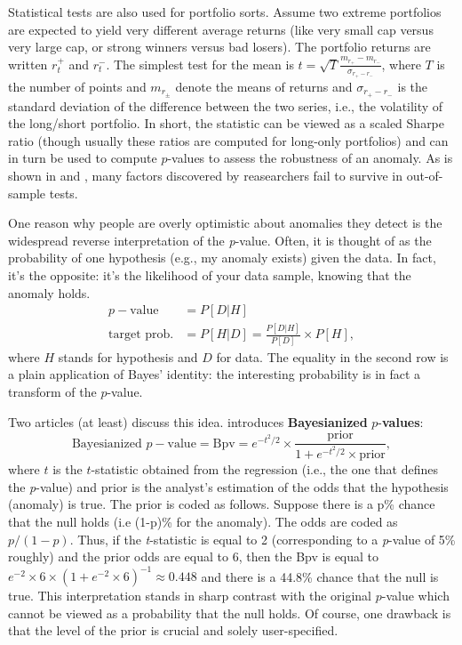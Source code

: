 \documentclass[]{krantz}
\theoremstyle{definition}
\theoremstyle{definition}
\theoremstyle{definition}
\theoremstyle{remark}
\begin{document}
Statistical tests are also used for portfolio sorts. Assume two extreme
portfolios are expected to yield very different average returns (like
very small cap versus very large cap, or strong winners versus bad
losers). The portfolio returns are written \(r_t^+\) and \(r_t^-\). The
simplest test for the mean is
\(t=\sqrt{T}\frac{m_{r_+}-m_{r_-}}{\sigma_{r_+-r_-}}\), where \(T\) is
the number of points and \(m_{r_\pm}\) denote the means of returns and
\(\sigma_{r_+-r_-}\) is the standard deviation of the difference between
the two series, i.e., the volatility of the long/short portfolio. In
short, the statistic can be viewed as a scaled Sharpe ratio (though
usually these ratios are computed for long-only portfolios) and can in
turn be used to compute \(p\)-values to assess the robustness of an
anomaly. As is shown in \citet{linnainmaa2018history} and
\citet{hou2019replicating}, many factors discovered by reasearchers fail
to survive in out-of-sample tests.

One reason why people are overly optimistic about anomalies they detect
is the widespread reverse interpretation of the \emph{p}-value. Often,
it is thought of as the probability of one hypothesis (e.g., my anomaly
exists) given the data. In fact, it's the opposite: it's the likelihood
of your data sample, knowing that the anomaly holds. \begin{align*}
p-\text{value} &= P[D|H] \\
\text{target prob.}& = P[H|D]=\frac{P[D|H]}{P[D]}\times P[H],
\end{align*} where \(H\) stands for hypothesis and \(D\) for data. The
equality in the second row is a plain application of Bayes' identity:
the interesting probability is in fact a transform of the \(p\)-value.

Two articles (at least) discuss this idea.
\citet{harvey2017presidential} introduces \textbf{Bayesianized}
\(p\)-\textbf{values}: \begin{equation}
\label{eq:Bpv}
\text{Bayesianized } p-\text{value}=\text{Bpv}= e^{-t^2/2}\times\frac{\text{prior}}{1+e^{-t^2/2}\times \text{prior}} ,
\end{equation} where \(t\) is the \(t\)-statistic obtained from the
regression (i.e., the one that defines the \emph{p}-value) and prior is
the analyst's estimation of the odds that the hypothesis (anomaly) is
true. The prior is coded as follows. Suppose there is a p\% chance that
the null holds (i.e (1-p)\% for the anomaly). The odds are coded as
\(p/(1-p)\). Thus, if the \emph{t}-statistic is equal to 2
(corresponding to a \emph{p}-value of 5\% roughly) and the prior odds
are equal to 6, then the Bpv is equal to
\(e^{-2}\times 6 \times(1+e^{-2}\times 6)^{-1}\approx 0.448\) and there
is a 44.8\% chance that the null is true. This interpretation stands in
sharp contrast with the original \(p\)-value which cannot be viewed as a
probability that the null holds. Of course, one drawback is that the
level of the prior is crucial and solely user-specified.
\end{document}
